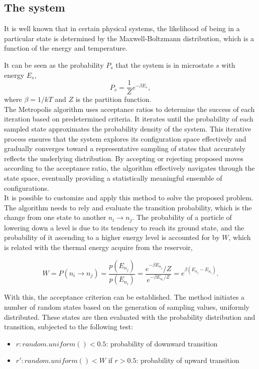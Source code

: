 \documentclass[%
 reprint,
 amsmath,amssymb,
 aps,
]{revtex4-2}
\begin{document}
\subsection{The system}
It is well known that in certain physical systems, the likelihood of being in a particular state is determined by the Maxwell-Boltzmann distribution, which is a function of the energy and temperature. \par
It can be seen as the  probability $P_{s}$ that the system is in microstate $s$ with energy $E_{s}$,
\begin{equation}
        P_s=\frac{1}{Z} e^{-\beta E_s}, 
\end{equation}
where $\beta=1 / k T$ and $Z$ is the partition function. \\

The Metropolis algorithm uses acceptance ratios to determine the success of each iteration based on predetermined criteria. It iterates until the probability of each sampled state approximates the probability density of the system. This iterative process ensures that the system explores its configuration space effectively and gradually converges toward a representative sampling of states that accurately reflects the underlying distribution. By accepting or rejecting proposed moves according to the acceptance ratio, the algorithm effectively navigates through the state space, eventually providing a statistically meaningful ensemble of configurations. \\
It is possible to customize and apply this method to solve the proposed problem. The algorithm needs to rely and evaluate the transition probability, which is the change from one state to another $n_i \rightarrow n_j $. The probability of a particle of lowering down a level is due to its tendency to reach its ground state, and the probability of it ascending to a higher energy level is accounted for by $W$, which is related with the thermal energy acquire from the reservoir,

\begin{equation}
       W=P\left(n_i \rightarrow n_j\right)=\frac{p\left(E_{n_j}\right)}{p\left(E_{n_i}\right)}=\frac{e^{-\beta E_{n_j}} / Z}{e^{-\beta E_{n_i} / Z}}=e^{\beta\left(E_{n_j}-E_{n_i}\right)}.
\end{equation}

With this, the acceptance criterion can be established. The method initiates a number of random states based on the generation of sampling values, uniformly distributed. These states are then evaluated with the probability distribution and transition, subjected to the following test: 
\begin{itemize}
    \item $r: random.uniform()<0.5$: probability of downward transition
    \item $r': random.uniform()<W$ if $r>0.5$: probability of upward transition
\end{itemize}
\end{document}
